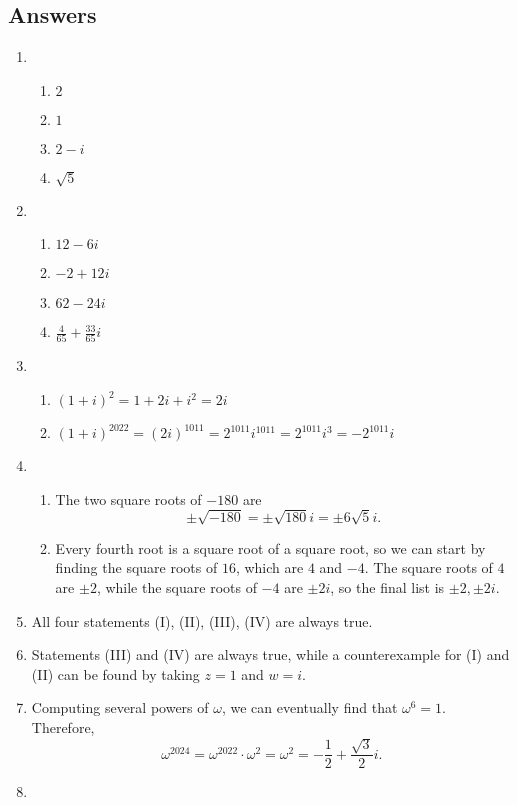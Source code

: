 \newpage
\subsection{Answers}

\begin{enumerate}
\item \begin{enumerate}
\item $2$
\item $1$
\item $2 - i$
\item $\sqrt{5}$
\end{enumerate}
\item \begin{enumerate}
\item $12 - 6i$
\item $-2 + 12i$
\item $62 - 24i$
\item $\frac{4}{65} + \frac{33}{65}i$
\end{enumerate}
\item \begin{enumerate}
\item $(1 + i)^2 = 1 + 2i + i^2 = \boxed{2i}$
\item $(1 + i)^{2022} = (2i)^{1011} = 2^{1011}i^{1011} = 2^{1011}i^3 = \boxed{-2^{1011}i}$
\end{enumerate}
\item \begin{enumerate}
\item The two square roots of $-180$ are
\begin{equation*}
\pm\sqrt{-180} = \pm\sqrt{180}i = \boxed{\pm 6\sqrt{5}i}.
\end{equation*}
\item Every fourth root is a square root of a square root, so we can start by finding the square roots of $16$, which are $4$ and $-4$. The square roots of $4$ are $\pm 2$, while the square roots of $-4$ are $\pm 2i$, so the final list is $\boxed{\pm 2, \pm 2i}$.
\end{enumerate}
\item All four statements (I), (II), (III), (IV) are always true.
\item Statements (III) and (IV) are always true, while a counterexample for (I) and (II) can be found by taking $z = 1$ and $w = i$.
\item Computing several powers of $\omega$, we can eventually find that $\omega^6 = 1$. Therefore,
\begin{equation*}
\omega^{2024} = \omega^{2022}\cdot\omega^2 = \omega^2 = \boxed{-\frac{1}{2} + \frac{\sqrt{3}}{2}i}.
\end{equation*}
\item 
\end{enumerate}
